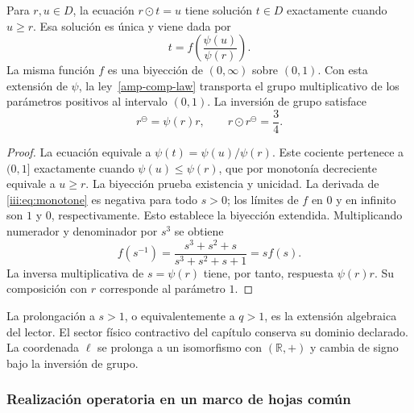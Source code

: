 \begin{proposition}
\label{amp-comp-inverse}
Para $r,u\in D$, la ecuación $r\odot t=u$ tiene solución $t\in D$
exactamente cuando $u\geq r$. Esa solución es única y viene dada por
\begin{equation}
 t=f\!\left(\frac{\psi(u)}{\psi(r)}\right).
 \label{amp-comp-cancellation}
\end{equation}
La misma función $f$ es una biyección de $(0,\infty)$ sobre $(0,1)$.
Con esta extensión de $\psi$, la ley~\eqref{amp-comp-law} transporta el
grupo multiplicativo de los parámetros positivos al intervalo $(0,1)$.
La inversión de grupo satisface
\begin{equation}
 r^{\ominus}=\psi(r)r,\qquad
 r\odot r^{\ominus}=\frac34.
 \label{amp-comp-group-inverse}
\end{equation}
\end{proposition}
\begin{proof}
La ecuación equivale a
$\psi(t)=\psi(u)/\psi(r)$. Este cociente pertenece a $(0,1]$
exactamente cuando $\psi(u)\leq\psi(r)$, que por monotonía decreciente
equivale a $u\geq r$. La biyección prueba existencia y unicidad.
La derivada de \eqref{iii:eq:monotone} es negativa para todo $s>0$;
los límites de $f$ en $0$ y en infinito son $1$ y $0$, respectivamente.
Esto establece la biyección extendida. Multiplicando numerador y
denominador por $s^3$ se obtiene
\[
 f(s^{-1})=\frac{s^3+s^2+s}{s^3+s^2+s+1}=s f(s).
\]
La inversa multiplicativa de $s=\psi(r)$ tiene, por tanto, respuesta
$\psi(r)r$. Su composición con $r$ corresponde al parámetro $1$.
\end{proof}

La prolongación a $s>1$, o equivalentemente a $q>1$, es la extensión
algebraica del lector. El sector físico contractivo del capítulo conserva
su dominio declarado. La coordenada $\ell$ se prolonga a un isomorfismo
con $(\mathbb R,+)$ y cambia de signo bajo la inversión de grupo.

\subsubsection{Realización operatoria en un marco de hojas común}

